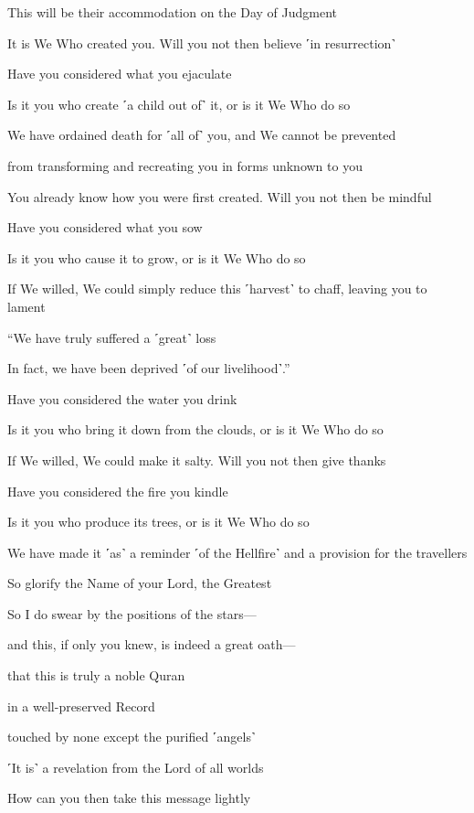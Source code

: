 This will be their accommodation on the Day of Judgment

It is We Who created you. Will you not then believe ˹in resurrection˺

Have you considered what you ejaculate

Is it you who create ˹a child out of˺ it, or is it We Who do so

We have ordained death for ˹all of˺ you, and We cannot be prevented

from transforming and recreating you in forms unknown to you

You already know how you were first created. Will you not then be mindful

Have you considered what you sow

Is it you who cause it to grow, or is it We Who do so

If We willed, We could simply reduce this ˹harvest˺ to chaff, leaving you to lament

“We have truly suffered a ˹great˺ loss

In fact, we have been deprived ˹of our livelihood˺.”

Have you considered the water you drink

Is it you who bring it down from the clouds, or is it We Who do so

If We willed, We could make it salty. Will you not then give thanks

Have you considered the fire you kindle

Is it you who produce its trees, or is it We Who do so

We have made it ˹as˺ a reminder ˹of the Hellfire˺ and a provision for the travellers

So glorify the Name of your Lord, the Greatest

So I do swear by the positions of the stars—

and this, if only you knew, is indeed a great oath—

that this is truly a noble Quran

in a well-preserved Record

touched by none except the purified ˹angels˺

˹It is˺ a revelation from the Lord of all worlds

How can you then take this message lightly

